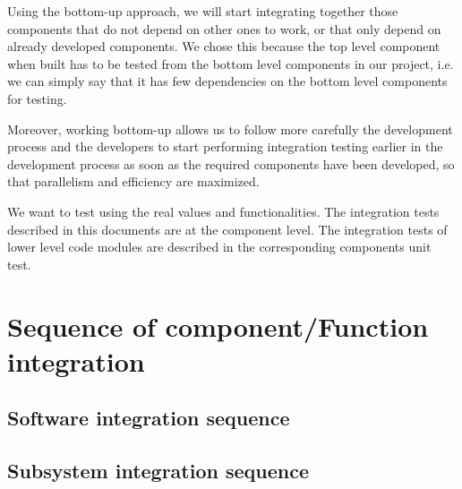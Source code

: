 Using the bottom-up approach, we will start integrating together those components that do not depend on other ones to work, or that only depend on already developed components. We chose this because the top level component when built has to be tested from the bottom level components in our project, i.e. we can simply say that it has few dependencies on the bottom level components for testing.

Moreover, working bottom-up allows us to follow more carefully the development process and the developers to start performing integration testing earlier in the development process as soon as the required components have been developed, so that parallelism and efficiency are maximized.

We want to test using the real values and functionalities. The integration tests described in this documents are at the component level. The integration tests of lower level code modules are described in the corresponding components unit test.

\section{Sequence of component/Function integration}

\subsection{Software integration sequence}
\subsection{Subsystem integration sequence}